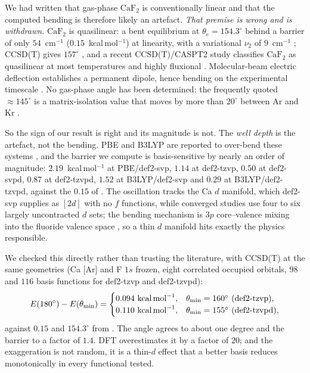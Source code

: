 \documentclass[11pt,a4paper]{article}
\theoremstyle{plain}
\theoremstyle{definition}
\theoremstyle{remark}
\begin{document}
We had written that gas-phase $\mathrm{CaF_2}$ is conventionally linear and that
the computed bending is therefore likely an artefact. \emph{That premise is wrong
and is withdrawn.} $\mathrm{CaF_2}$ is quasilinear: a bent equilibrium at
$\theta_e = 154.3^\circ$ behind a barrier of only $54$~cm$^{-1}$
($0.15$~kcal\,mol$^{-1}$) at linearity, with a variational $\nu_2$ of
$9$~cm$^{-1}$ \citep{Koput2004}; CCSD(T) gives $157^\circ$ \citep{Vasiliu2010}, and
a recent CCSD(T)/CASPT2 study classifies $\mathrm{CaF_2}$ as quasilinear at most
temperatures and highly fluxional \citep{Romeu2025}. Molecular-beam electric
deflection establishes a permanent dipole, hence bending on the experimental
timescale \citep{Wharton1963}. No gas-phase angle has been determined: the
frequently quoted $\approx145^\circ$ is a matrix-isolation value that moves by more
than $20^\circ$ between Ar and Kr \citep{Calder1969}.

So the sign of our result is right and its magnitude is not. The \emph{well depth}
is the artefact, not the bending. PBE and B3LYP are reported to over-bend these
systems \citep{Donald2006}, and the barrier we compute is basis-sensitive by nearly
an order of magnitude: $2.19$~kcal\,mol$^{-1}$ at PBE/def2-svp, $1.14$ at
def2-tzvp, $0.50$ at def2-svpd, $0.87$ at def2-tzvpd, $1.52$ at B3LYP/def2-svp and
$0.29$ at B3LYP/def2-tzvpd, against the $0.15$ of \citet{Koput2004}. The
oscillation tracks the Ca $d$ manifold, which def2-svp supplies as $[2d]$ with no
$f$ functions, while converged studies use four to six largely uncontracted $d$
sets; the bending mechanism is $3p$ core--valence mixing into the fluoride
valence space \citep{Romeu2025}, so a thin $d$ manifold hits exactly the physics
responsible.

We checked this directly rather than trusting the literature, with CCSD(T) at the
same geometries (Ca [Ar] and F $1s$ frozen, eight correlated occupied orbitals,
$98$ and $116$ basis functions for def2-tzvp and def2-tzvpd):
\[
  E(180^\circ)-E(\theta_{\min}) =
  \begin{cases}
    0.094\ \text{kcal\,mol}^{-1}, & \theta_{\min}=160^\circ \ (\text{def2-tzvp}),\\
    0.110\ \text{kcal\,mol}^{-1}, & \theta_{\min}=155^\circ \ (\text{def2-tzvpd}),
  \end{cases}
\]
against $0.15$ and $154.3^\circ$ from \citet{Koput2004}. The angle agrees to about
one degree and the barrier to a factor of $1.4$. DFT overestimates it by a factor of
$20$; and the exaggeration is not random, it is a thin-$d$ effect that a better
basis reduces monotonically in every functional tested.
\end{document}
